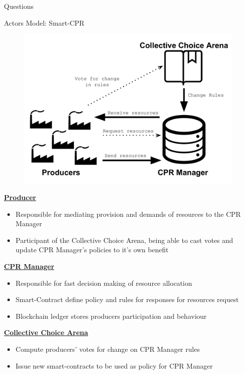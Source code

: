 \documentclass[xcolor={table}]{beamer}
\begin{document}
\begin{frame}[fragile=singleslide,t]
\begin{columns}[onlytextwidth,T]
\begin{column}{.48\textwidth}
\begin{block}{Questions}
\begin{itemize}
\end{itemize}
\end{block}


\begin{block}{Actors Model: Smart-CPR}
\begin{figure}
\centering
\includegraphics[width=0.7\linewidth]{pics/smartpool_ind.pdf}
\end{figure}


\underline{\textbf{Producer}}
\begin{itemize}
    \item Responsible for mediating provision and demands of resources to the CPR Manager
    \item Participant of the Collective Choice Arena, being able to cast votes and update CPR Manager's policies to it's own benefit
\end{itemize}

\underline{\textbf{CPR Manager}}

\begin{itemize}
    \item Responsible for fast decision making of resource allocation
    \item Smart-Contract define policy and rules for responses for resources request
    \item Blockchain ledger stores producers participation and behaviour
\end{itemize}

\underline{\textbf{Collective Choice Arena}}

\begin{itemize}
    \item Compute producers' votes for change on CPR Manager rules
    \item Issue new smart-contracts to be used as policy for CPR Manager
\end{itemize}




\end{block}
\end{column}
\end{columns}
\end{frame}
\end{document}
